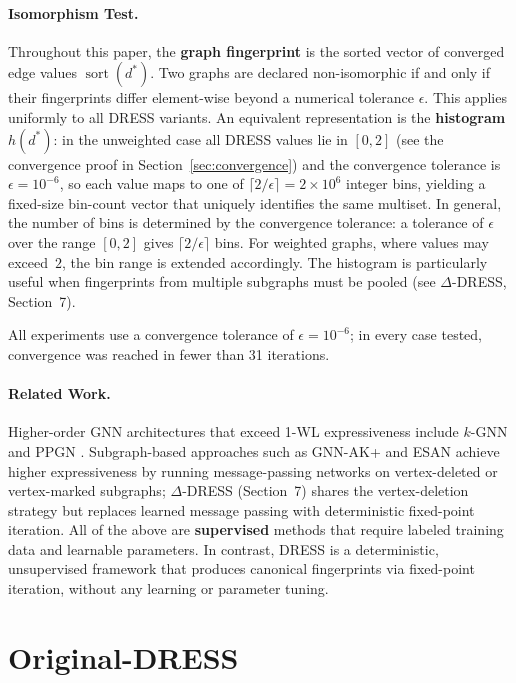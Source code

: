 \documentclass[11pt,a4paper]{article}
\begin{document}
\paragraph{Isomorphism Test.} Throughout this paper, the \textbf{graph fingerprint} is the sorted vector of converged edge values $\operatorname{sort}(d^*)$. Two graphs are declared non-isomorphic if and only if their fingerprints differ element-wise beyond a numerical tolerance $\epsilon$. This applies uniformly to all DRESS variants. An equivalent representation is the \textbf{histogram} $h(d^*)$: in the unweighted case all DRESS values lie in $[0, 2]$ (see the convergence proof in Section~\ref{sec:convergence}) and the convergence tolerance is $\epsilon = 10^{-6}$, so each value maps to one of $\lceil 2/\epsilon \rceil = 2 \times 10^{6}$ integer bins, yielding a fixed-size bin-count vector that uniquely identifies the same multiset. In general, the number of bins is determined by the convergence tolerance: a tolerance of $\epsilon$ over the range $[0, 2]$ gives $\lceil 2/\epsilon \rceil$ bins. For weighted graphs, where values may exceed~$2$, the bin range is extended accordingly. The histogram is particularly useful when fingerprints from multiple subgraphs must be pooled (see $\Delta$-DRESS, Section~7).

All experiments use a convergence tolerance of $\epsilon = 10^{-6}$; in every case tested, convergence was reached in fewer than 31 iterations.

\paragraph{Related Work.} Higher-order GNN architectures that exceed 1-WL expressiveness include $k$-GNN \cite{morris2019weisfeiler} and PPGN \cite{maron2019provably}. Subgraph-based approaches such as GNN-AK+ \cite{zhao2022from} and ESAN \cite{bevilacqua2022equivariant} achieve higher expressiveness by running message-passing networks on vertex-deleted or vertex-marked subgraphs; $\Delta$-DRESS (Section~7) shares the vertex-deletion strategy but replaces learned message passing with deterministic fixed-point iteration. All of the above are \textbf{supervised} methods that require labeled training data and learnable parameters. In contrast, DRESS is a deterministic, unsupervised framework that produces canonical fingerprints via fixed-point iteration, without any learning or parameter tuning.

\section{Original-DRESS}
\end{document}

